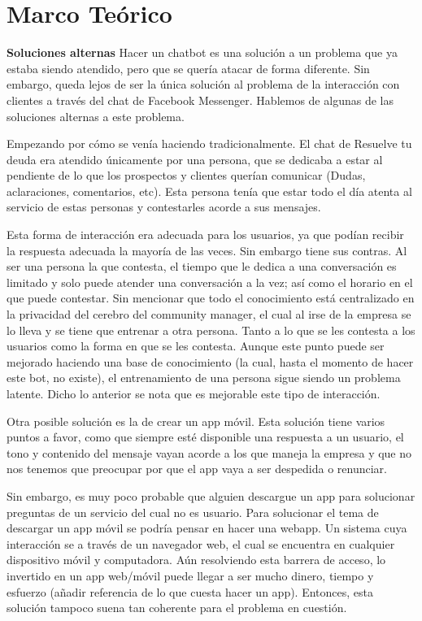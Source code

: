 \chapter{Marco Teórico}

\textbf{Soluciones alternas}
Hacer un chatbot es una solución a un problema que ya estaba siendo atendido, pero que se quería atacar de forma diferente. Sin embargo, queda lejos de ser la única solución al problema de la interacción con clientes a través del chat de Facebook Messenger. Hablemos de algunas de las soluciones alternas a este problema.

 Empezando por cómo se venía haciendo tradicionalmente. El chat de Resuelve tu deuda era atendido únicamente por una persona, que se dedicaba a estar al pendiente de lo que los prospectos y clientes querían comunicar (Dudas, aclaraciones, comentarios, etc). Esta persona tenía que estar todo el día atenta al servicio de estas personas y contestarles acorde a sus mensajes. 

Esta forma de interacción era adecuada para los usuarios, ya que podían recibir la respuesta adecuada la mayoría de las veces. Sin embargo tiene sus contras. Al ser una persona la que contesta, el tiempo que le dedica a una conversación es limitado y solo puede atender una conversación a la vez; así como el horario en el que puede contestar. Sin mencionar que todo el conocimiento está centralizado en la privacidad del cerebro del community manager, el cual al irse de la empresa se lo lleva y se tiene que entrenar a otra persona. Tanto a lo que se les contesta a los usuarios como la forma en que se les contesta. Aunque este punto puede ser mejorado haciendo una base de conocimiento (la cual, hasta el momento de hacer este bot, no existe), el entrenamiento de una persona sigue siendo un problema latente. Dicho lo anterior se nota que es mejorable este tipo de interacción. 

Otra posible solución es la de crear un app móvil. Esta solución tiene varios puntos a favor, como que siempre esté disponible una respuesta a un usuario, el tono y contenido del mensaje vayan acorde a los que maneja la empresa y que no nos tenemos que preocupar por que el app vaya a ser despedida o renunciar. 

Sin embargo, es muy poco probable que alguien descargue un app para solucionar preguntas de un servicio del cual no es usuario. Para solucionar el tema de descargar un app móvil se podría pensar en hacer una webapp. Un sistema cuya interacción se a través de un navegador web, el cual se encuentra en cualquier dispositivo móvil y computadora. Aún resolviendo esta barrera de acceso, lo invertido en un app web/móvil puede llegar a ser mucho dinero, tiempo y esfuerzo (añadir referencia de lo que cuesta hacer un app).  Entonces, esta solución tampoco suena tan coherente para el problema en cuestión.


